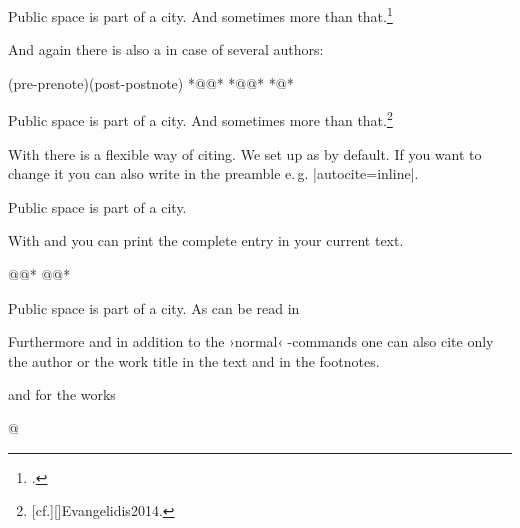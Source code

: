 \documentclass[a4paper,
10pt,
greek,
french,
spanish,
italian,
ngerman,
english
]{ltxdoc}
\begin{document}
\begin{example}
Public space is part of a city.\smartcite{Osland2016} 
And sometimes more than that.\footnote{\smartcite[cf.][]{Evangelidis2014}.}
\end{example}


\DescribeMacro{\smartcites}
And again there is also a  in case of several authors: 
\begin{code}
\smartcites(pre-prenote)(post-postnote)%
  *@@*%
  *@@*%
  *@\ldots@*
\end{code}
\begin{example}
Public space is part of a city. 
And sometimes more than that.\footnote{[cf.][]{Evangelidis2014}.}
\end{example}

\DescribeMacro{\autocite}
With  there is a flexible way of citing. 
We set up  as  by default.
If you want to change it you can also write in the preamble e.\,g. |autocite=inline|.

\begin{example}
Public space is part of a city.\autocite{Osland2016} 
\end{example}

\DescribeMacro{\fullcite}\DescribeMacro{\footfullcite}
With  and  you can print the complete entry in your current text.
\begin{code}
\fullcite*@@*
\footfullcite*@@*
\end{code} 

\begin{example}
Public space is part of a city.
As can be read in 
\end{example}



\DescribeMacro{\citeauthor}\DescribeMacro{\citetitle}\label{citeauthor}%
Furthermore and in addition to the ›normal‹ -commands one can also cite only the author or the work title in the text and in the footnotes.
  and for the works 
\begin{code}
\citetitle*@%
\end{code} 
\end{document}
